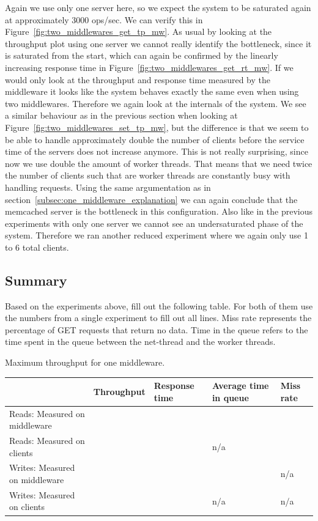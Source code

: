 \documentclass[11pt,a4paper]{article}
\begin{document}
Again we use only one server here, so we expect the system to be saturated again at approximately 3000 ops/sec.
%
We can verify this in Figure~\ref{fig:two_middlewares_get_tp_mw}.
%
As usual by looking at the throughput plot using one server we cannot really identify the bottleneck, since it is saturated from the start, which can again be confirmed by the linearly increasing response time in Figure~\ref{fig:two_middlewares_get_rt_mw}.
%
If we would only look at the throughput and response time measured by the middleware it looks like the system behaves exactly the same even when using two middlewares.
%
Therefore we again look at the internals of the system.
%
We see a similar behaviour as in the previous section when looking at Figure~\ref{fig:two_middlewares_set_tp_mw}, but the difference is that we seem to be able to handle approximately double the number of clients before the service time of the servers does not increase anymore.
%
This is not really surprising, since now we use double the amount of worker threads.
%
That means that we need twice the number of clients such that are worker threads are constantly busy with handling requests.
%
Using the same argumentation as in section~\ref{subsec:one_middleware_explanation} we can again conclude that the memcached server is the bottleneck in this configuration.
%
Also like in the previous experiments with only one server we cannot see an undersaturated phase of the system.
%
Therefore we ran another reduced experiment where we again only use 1 to 6 total clients.
%
%
\subsection{Summary}

Based on the experiments above, fill out the following table. For both of them use the numbers from a single experiment to fill out all lines. Miss rate represents the percentage of GET requests that return no data. Time in the queue refers to the time spent in the queue between the net-thread and the worker threads.


\begin{center}
	{Maximum throughput for one middleware.}
	\begin{tabular}{|l|p{2cm}|p{2cm}|p{2cm}|p{2cm}|}
		\hline                                & Throughput & Response time & Average time in queue & Miss rate \\ 
		\hline Reads: Measured on middleware  &            &               &                       &           \\ 
		\hline Reads: Measured on clients     &            &               & n/a                   &           \\ 
		\hline Writes: Measured on middleware &            &               &                       & n/a       \\ 
		\hline Writes: Measured on clients    &            &               & n/a                   & n/a       \\ 
		\hline 
	\end{tabular}
\end{center}
\end{document}
